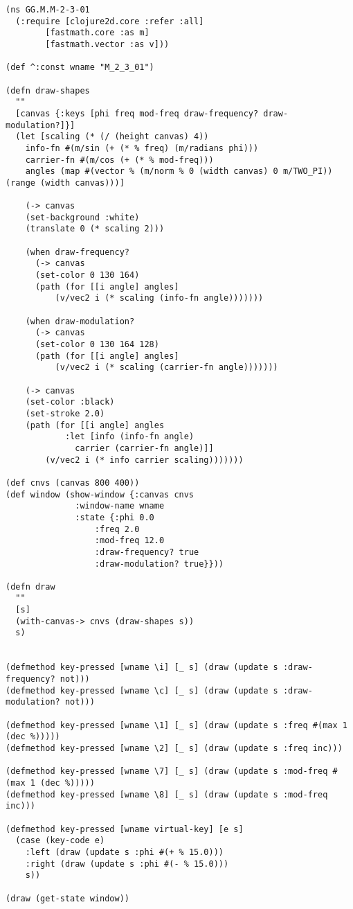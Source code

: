 \documentclass[11pt]{article}
\begin{document}
\begin{verbatim}
(ns GG.M.M-2-3-01
  (:require [clojure2d.core :refer :all]
	    [fastmath.core :as m]
	    [fastmath.vector :as v]))

(def ^:const wname "M_2_3_01")

(defn draw-shapes
  ""
  [canvas {:keys [phi freq mod-freq draw-frequency? draw-modulation?]}]
  (let [scaling (* (/ (height canvas) 4))
	info-fn #(m/sin (+ (* % freq) (m/radians phi)))
	carrier-fn #(m/cos (+ (* % mod-freq)))
	angles (map #(vector % (m/norm % 0 (width canvas) 0 m/TWO_PI)) (range (width canvas)))]

    (-> canvas 
	(set-background :white)
	(translate 0 (* scaling 2)))

    (when draw-frequency?
      (-> canvas
	  (set-color 0 130 164)
	  (path (for [[i angle] angles]
		  (v/vec2 i (* scaling (info-fn angle)))))))

    (when draw-modulation?
      (-> canvas
	  (set-color 0 130 164 128)
	  (path (for [[i angle] angles]
		  (v/vec2 i (* scaling (carrier-fn angle)))))))

    (-> canvas
	(set-color :black)
	(set-stroke 2.0)
	(path (for [[i angle] angles
		    :let [info (info-fn angle)
			  carrier (carrier-fn angle)]]
		(v/vec2 i (* info carrier scaling)))))))

(def cnvs (canvas 800 400))
(def window (show-window {:canvas cnvs
			  :window-name wname
			  :state {:phi 0.0
				  :freq 2.0
				  :mod-freq 12.0
				  :draw-frequency? true
				  :draw-modulation? true}}))

(defn draw
  ""
  [s]
  (with-canvas-> cnvs (draw-shapes s))
  s)


(defmethod key-pressed [wname \i] [_ s] (draw (update s :draw-frequency? not)))
(defmethod key-pressed [wname \c] [_ s] (draw (update s :draw-modulation? not)))

(defmethod key-pressed [wname \1] [_ s] (draw (update s :freq #(max 1 (dec %)))))
(defmethod key-pressed [wname \2] [_ s] (draw (update s :freq inc)))

(defmethod key-pressed [wname \7] [_ s] (draw (update s :mod-freq #(max 1 (dec %)))))
(defmethod key-pressed [wname \8] [_ s] (draw (update s :mod-freq inc)))

(defmethod key-pressed [wname virtual-key] [e s]
  (case (key-code e)
    :left (draw (update s :phi #(+ % 15.0)))
    :right (draw (update s :phi #(- % 15.0)))
    s))

(draw (get-state window))
\end{verbatim}
\end{document}
